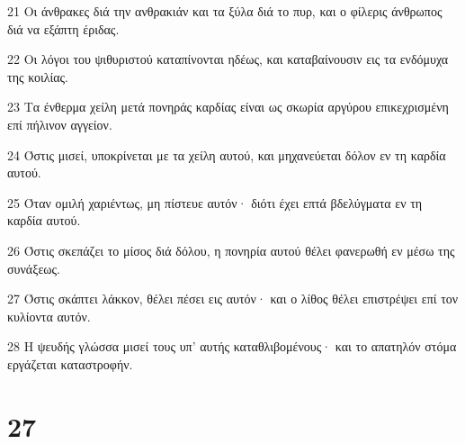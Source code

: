 \par 21 Οι άνθρακες διά την ανθρακιάν και τα ξύλα διά το πυρ, και ο φίλερις άνθρωπος διά να εξάπτη έριδας.
\par 22 Οι λόγοι του ψιθυριστού καταπίνονται ηδέως, και καταβαίνουσιν εις τα ενδόμυχα της κοιλίας.
\par 23 Τα ένθερμα χείλη μετά πονηράς καρδίας είναι ως σκωρία αργύρου επικεχρισμένη επί πήλινον αγγείον.
\par 24 Όστις μισεί, υποκρίνεται με τα χείλη αυτού, και μηχανεύεται δόλον εν τη καρδία αυτού.
\par 25 Όταν ομιλή χαριέντως, μη πίστευε αυτόν· διότι έχει επτά βδελύγματα εν τη καρδία αυτού.
\par 26 Όστις σκεπάζει το μίσος διά δόλου, η πονηρία αυτού θέλει φανερωθή εν μέσω της συνάξεως.
\par 27 Όστις σκάπτει λάκκον, θέλει πέσει εις αυτόν· και ο λίθος θέλει επιστρέψει επί τον κυλίοντα αυτόν.
\par 28 Η ψευδής γλώσσα μισεί τους υπ' αυτής καταθλιβομένους· και το απατηλόν στόμα εργάζεται καταστροφήν.

\chapter{27}

